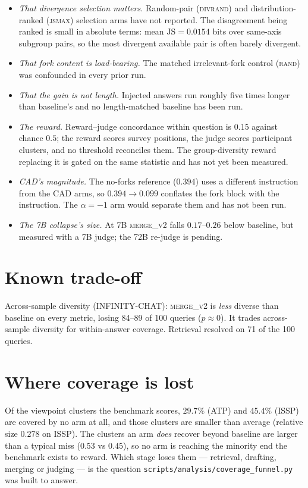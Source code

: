 \documentclass[11pt]{article}
\begin{document}
\begin{itemize}
  \item \emph{That divergence selection matters.} Random-pair (\textsc{divrand})
    and distribution-ranked (\textsc{jsmax}) selection arms have not reported.
    The disagreement being ranked is small in absolute terms: mean
    $\mathrm{JS} = 0.0154$ bits over same-axis subgroup pairs, so the most
    divergent available pair is often barely divergent.
  \item \emph{That fork content is load-bearing.} The matched irrelevant-fork
    control (\textsc{rand}) was confounded in every prior run.
  \item \emph{That the gain is not length.} Injected answers run roughly five
    times longer than baseline's and no length-matched baseline has been run.
  \item \emph{The reward.} Reward--judge concordance within question is $0.15$
    against chance $0.5$; the reward scores survey positions, the judge scores
    participant clusters, and no threshold reconciles them. The group-diversity
    reward replacing it is gated on the same statistic and has not yet been
    measured.
  \item \emph{CAD's magnitude.} The no-forks reference ($0.394$) uses a different
    instruction from the CAD arms, so $0.394 \to 0.099$ conflates the fork block
    with the instruction. The $\alpha = -1$ arm would separate them and has not
    been run.
  \item \emph{The 7B collapse's size.} At 7B \textsc{merge\_v2} falls
    $0.17$--$0.26$ below baseline, but measured with a 7B judge; the 72B re-judge
    is pending.
\end{itemize}

\section{Known trade-off}

Across-sample diversity (INFINITY-CHAT): \textsc{merge\_v2} is \emph{less}
diverse than baseline on every metric, losing 84--89 of 100 queries
($p \approx 0$). It trades across-sample diversity for within-answer coverage.
Retrieval resolved on 71 of the 100 queries.

\section{Where coverage is lost}

Of the viewpoint clusters the benchmark scores, $29.7\%$ (ATP) and $45.4\%$
(ISSP) are covered by no arm at all, and those clusters are smaller than average
(relative size $0.278$ on ISSP). The clusters an arm \emph{does} recover beyond
baseline are larger than a typical miss ($0.53$ vs $0.45$), so no arm is reaching
the minority end the benchmark exists to reward. Which stage loses them ---
retrieval, drafting, merging or judging --- is the question
\texttt{scripts/analysis/coverage\_funnel.py} was built to answer.
\end{document}
